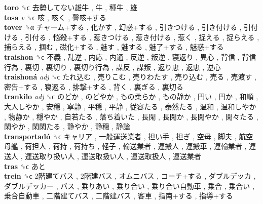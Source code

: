 \textbf{toro} ␝ϲ   去勢してない雄牛 ,  牛 ,  種牛 ,  雄   \\
\textbf{tosa} \emph{v}  ␝ϲ   咳 ,  咳く ,  謦咳+する   \\
\textbf{tover} ␝α   チャーム+する ,  化かす ,  幻惑+する ,  引きつける ,  引き付ける ,  引付ける ,  引付る ,  悩殺+する ,  惹きつける ,  惹き付ける ,  惹く ,  捉える ,  捉らえる ,  捕らえる ,  掴む ,  磁化+する ,  魅す ,  魅する ,  魅了+する ,  魅惑+する   \\
\textbf{traishon} ␝ϲ   不義 ,  乱逆 ,  内応 ,  内通 ,  反逆 ,  叛逆 ,  寝返り ,  異心 ,  背信 ,  背信行為 ,  裏切 ,  裏切り ,  裏切り行為 ,  謀反 ,  謀叛 ,  返り忠 ,  返忠 ,  逆心   \\
\textbf{traishoná} \emph{adj}  ␝ϲ   たれ込む ,  売りこむ ,  売りわたす ,  売り込む ,  売る ,  売渡す ,  密告+する ,  寝返る ,  排撃+する ,  背く ,  裏ぎる ,  裏切る   \\
\textbf{trankilo} \emph{adj}  ␝ϲ   のどか ,  のどやか ,  もの柔らか ,  もの静か ,  円い ,  円か ,  和順 ,  大人しやか ,  安穏 ,  寧静 ,  平穏 ,  平静 ,  従容たる ,  泰然たる ,  温和 ,  温和しやか ,  物静か ,  穏やか ,  自若たる ,  落ち着いた ,  長閑 ,  長閑か ,  長閑やか ,  閑々たる ,  閑やか ,  閑閑たる ,  静やか ,  静穏 ,  静謐   \\
\textbf{transportadó} ␝ϲ   キャリア ,  一般運送業者 ,  担い手 ,  担ぎ ,  空母 ,  脚夫 ,  航空母艦 ,  荷担人 ,  荷持 ,  荷持ち ,  軽子 ,  輸送業者 ,  運搬人 ,  運搬車 ,  運輸業者 ,  運送人 ,  運送取り扱い人 ,  運送取扱い人 ,  運送取扱人 ,  運送業者   \\
\textbf{tras} ␝ϲ   あと   \\
\textbf{trein} ␝ϲ   2階建てバス ,  2階建バス ,  オムニバス ,  コーチ+する ,  ダブルデッカ ,  ダブルデッカー ,  バス ,  乗りあい ,  乗り合い ,  乗り合い自動車 ,  乗合 ,  乗合い ,  乗合自動車 ,  二階建てバス ,  二階建バス ,  客車 ,  指南+する ,  指導+する   \\
